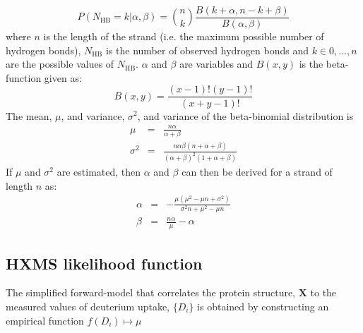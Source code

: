 \begin{equation}
P(N_\mathrm{HB} = k | \alpha, \beta) = \binom{n}{k} \frac{B(k+\alpha, n - k + \beta)}{B(\alpha, \beta)}
\end{equation}
where $n$ is the length of the strand (i.e. the maximum possible number of hydrogen bonds), $N_\mathrm{HB}$ is the number of observed hydrogen bonds and $k \in {0, ... ,n}$ are the possible values of $N_\mathrm{HB}$. $\alpha$ and $\beta$ are variables and $B(x,y)$ is the beta-function given as:
\begin{equation}
B(x,y)=\frac{(x-1)!(y-1)!}{(x+y-1)!}
\end{equation}
The mean, $\mu$, and variance, $\sigma^2$, and variance of the beta-binomial distribution is
\begin{eqnarray}
    \mu      & = & \frac{n\alpha}{\alpha + \beta}\\
    \sigma^2 & = & \frac{n\alpha\beta(n + \alpha + \beta)}{(\alpha + \beta)^2(1 + \alpha + \beta)}
\end{eqnarray}
If $\mu$ and $\sigma^2$ are estimated, then $\alpha$ and $\beta$ can then be derived for a strand of length $n$ as:
\begin{eqnarray}
    \alpha & = & -\frac{\mu(\mu^2 - \mu n + \sigma^2)}{\sigma^2 n + \mu^2 - \mu n}\\
    \beta  & = & \frac{n\alpha}{\mu} - \alpha
\end{eqnarray}


\subsection{HXMS likelihood function}

The simplified forward-model that correlates the protein structure, $\mathbf{X}$ to the measured values of deuterium uptake, $\{D_i\}$ is obtained by constructing an empirical function $f(D_i) \mapsto \mu$












